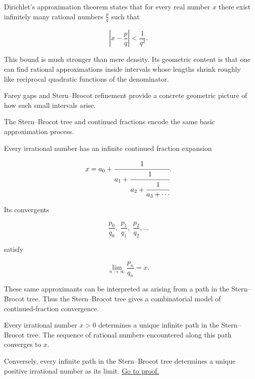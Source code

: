 
\begin{remark}
Dirichlet's approximation theorem states that for every real number $x$
there exist infinitely many rational numbers $\frac{p}{q}$ such that

\[
\left|x-\frac{p}{q}\right| < \frac{1}{q^2}.
\]

This bound is much stronger than mere density.  Its geometric content is
that one can find rational approximations inside intervals whose lengths
shrink roughly like reciprocal quadratic functions of the denominator.

Farey gaps and Stern--Brocot refinement provide a concrete geometric
picture of how such small intervals arise.
\end{remark}


\begin{remark}
The Stern--Brocot tree and continued fractions encode the same basic
approximation process.

Every irrational number has an infinite continued fraction expansion

\[
x
=
a_0 +
\cfrac{1}{a_1 +
\cfrac{1}{a_2 +
\cfrac{1}{a_3 + \cdots}}}.
\]

Its convergents

\[
\frac{p_0}{q_0},\;
\frac{p_1}{q_1},\;
\frac{p_2}{q_2},\dots
\]

satisfy

\[
\lim_{n\to\infty}\frac{p_n}{q_n}=x.
\]

These same approximants can be interpreted as arising from a path in
the Stern--Brocot tree.  Thus the Stern--Brocot tree gives a
combinatorial model of continued-fraction convergence.
\end{remark}


\begin{theorem}
\label{thm:stern-brocot-limit}

Every irrational number $x>0$ determines a unique infinite path in the
Stern--Brocot tree.  The sequence of rational numbers encountered along
this path converges to $x$.

Conversely, every infinite path in the Stern--Brocot tree determines a
unique positive irrational number as its limit.
\hyperref[prf:stern-brocot-limit]{Go to proof.}
\end{theorem}

